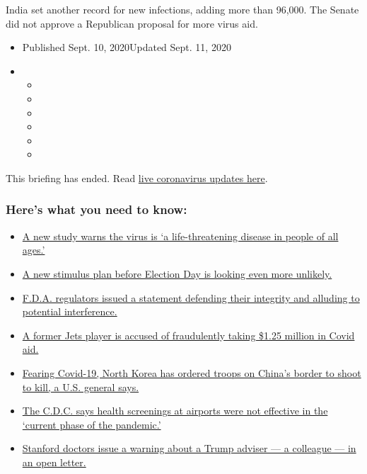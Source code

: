 India set another record for new infections, adding more than 96,000.
The Senate did not approve a Republican proposal for more virus aid.

\begin{itemize}
\item
  Published Sept. 10, 2020Updated Sept. 11, 2020
\item
  \begin{itemize}
  \item
  \item
  \item
  \item
  \item
  \item
  \end{itemize}
\end{itemize}

This briefing has ended. Read
\href{https://www.nytimes3xbfgragh.onion/2020/09/11/world/covid-19-coronavirus.html}{live
coronavirus updates here}.

\hypertarget{heres-what-you-need-to-know}{%
\subsubsection{Here's what you need to
know:}\label{heres-what-you-need-to-know}}

\begin{itemize}
\tightlist
\item
  \protect\hyperlink{link-39f95f8a}{A new study warns the virus is `a
  life-threatening disease in people of all ages.'}
\item
  \protect\hyperlink{link-45cd3ae4}{A new stimulus plan before Election
  Day is looking even more unlikely.}
\item
  \protect\hyperlink{link-2c9c9ed}{F.D.A. regulators issued a statement
  defending their integrity and alluding to potential interference.}
\item
  \protect\hyperlink{link-7af7f6c}{A former Jets player is accused of
  fraudulently taking \$1.25 million in Covid aid.}
\item
  \protect\hyperlink{link-517841d3}{Fearing Covid-19, North Korea has
  ordered troops on China's border to shoot to kill, a U.S. general
  says.}
\item
  \protect\hyperlink{link-10b7514b}{The C.D.C. says health screenings at
  airports were not effective in the `current phase of the pandemic.'}
\item
  \protect\hyperlink{link-14e948b0}{Stanford doctors issue a warning
  about a Trump adviser --- a colleague --- in an open letter.}
\end{itemize}

